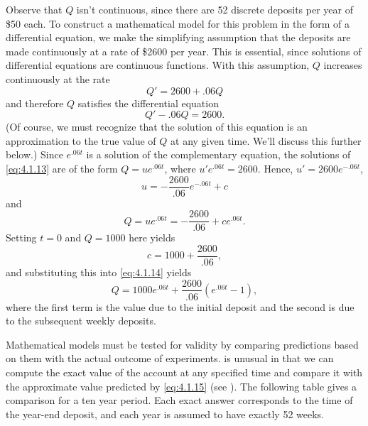 \begin{solution}
Observe that $Q$ isn't  continuous, since there are 52
discrete deposits per year of \$50 each. To construct a mathematical
model for this problem in the form of a differential equation, we make
the simplifying assumption that the deposits are made continuously at
a rate of \$2600 per year. This is essential, since solutions of
differential equations are continuous functions. With this assumption,
$Q$ increases continuously at the rate
\[
Q'=2600+.06 Q
\]
and therefore $Q$ satisfies the differential equation
\begin{equation} \label{eq:4.1.13}
Q'-.06Q=2600.
\end{equation}
(Of course, we must recognize that the solution of this equation
is an approximation to the true value of $Q$ at any given time. We'll
discuss this further below.)  Since $e^{.06t}$ is a solution of the
complementary equation, the solutions of \eqref{eq:4.1.13}  are of the
form   $Q=ue^{.06t}$,  where $u'e^{.06t}=2600$. Hence,
$u'=2600e^{-.06t}$,
\[
u=- \frac{2600}{.06}e^{-.06t}+c
\]
and
\begin{equation} \label{eq:4.1.14}
Q=ue^{.06t}=-\frac{2600}{.06}+ce^{.06t}.
\end{equation}
 Setting $t=0$ and $Q=1000$ here yields
\[
c=1000+\frac{2600}{.06},
\]
and substituting this into \eqref{eq:4.1.14} yields
\begin{equation} \label{eq:4.1.15}
Q=1000e^{.06t}+\frac{2600}{.06}(e^{.06t}-1),%
\end{equation}
where the first term is the value due to the initial deposit and the
second is due to the subsequent weekly deposits.
\end{solution}

Mathematical models must be tested for validity by comparing
predictions based on them with the actual outcome of experiments.
 is unusual in that we can compute the exact value of the
account at any specified time and compare it with the approximate
value predicted by \eqref{eq:4.1.15} (see ). The
following table
 gives a comparison for a ten year period. Each exact answer
corresponds to the time of the year-end deposit, and each year is
assumed to have exactly 52 weeks.

